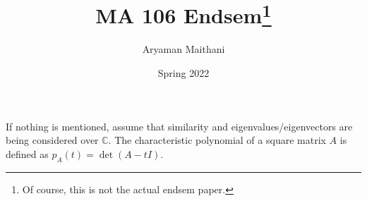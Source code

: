 \documentclass[12pt]{article}
\title{MA 106 Endsem\footnote{Of course, this is not the actual endsem paper.}}
\author{Aryaman Maithani}
\date{Spring 2022}
\begin{document}
\maketitle


If nothing is mentioned, assume that similarity and eigenvalues/eigenvectors are being considered over $\mathbb{C}$. The characteristic polynomial of a square matrix $A$ is defined as $p_{A}(t) = \det(A - tI)$.
\end{document}
